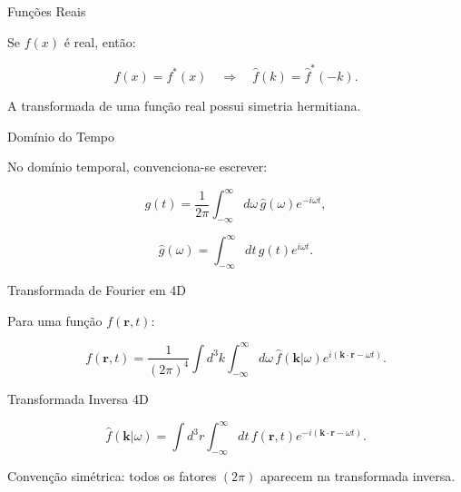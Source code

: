 \documentclass[aspectratio=169]{beamer}
\begin{document}
\begin{frame}{Funções Reais}

Se $f(x)$ é real, então:

\begin{equation}
f(x)=f^*(x)
\quad \Rightarrow \quad
\hat f(k)=\hat f^*(-k).
\tag{1.127}
\end{equation}

\begin{tcolorbox}[colback=blue!5,colframe=blue]
A transformada de uma função real possui simetria hermitiana.
\end{tcolorbox}

\end{frame}

\begin{frame}{Domínio do Tempo}

No domínio temporal, convenciona-se escrever:

\begin{equation}
g(t)=
\frac{1}{2\pi}
\int_{-\infty}^{\infty}
d\omega\, \hat g(\omega)e^{-i\omega t},
\end{equation}

\begin{equation}
\hat g(\omega)=
\int_{-\infty}^{\infty}
dt\, g(t)e^{i\omega t}.
\tag{1.128}
\end{equation}

\end{frame}

\begin{frame}{Transformada de Fourier em 4D}

Para uma função $f(\mathbf r,t)$:

\begin{equation}
f(\mathbf r,t)=
\frac{1}{(2\pi)^4}
\int d^3k
\int_{-\infty}^{\infty}
d\omega\,
\hat f(\mathbf k|\omega)
e^{i(\mathbf k\cdot \mathbf r-\omega t)}.
\tag{1.129}
\end{equation}

\end{frame}

\begin{frame}{Transformada Inversa 4D}

\begin{equation}
\hat f(\mathbf k|\omega)=
\int d^3r
\int_{-\infty}^{\infty}
dt\,
f(\mathbf r,t)
e^{-i(\mathbf k\cdot \mathbf r-\omega t)}.
\tag{1.130}
\end{equation}

\begin{tcolorbox}[colback=blue!5,colframe=blue]
Convenção simétrica: todos os fatores $(2\pi)$ aparecem na transformada inversa.
\end{tcolorbox}

\end{frame}
\end{document}
